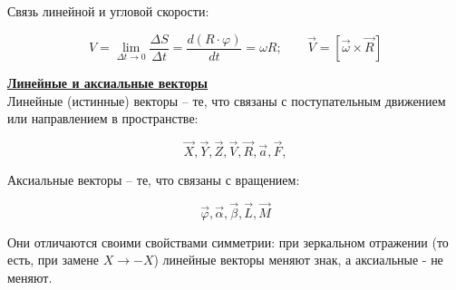 \documentclass[12pt,epsfig,color,russian]{article}
\begin{document}
Связь линейной и угловой скорости:

      \begin{displaymath}
      V=\lim_{\Delta t\rightarrow0}\frac{\Delta S}{\Delta t}=\frac{d(R\cdot\varphi)}{dt}=
      \omega R;\;\;\;\;\;\;\;\vec{V}=\left[\vec{\omega}\times\vec{R}\right]
      \end{displaymath}
\newpage

\underline{\bf Линейные и аксиальные векторы}\\

Линейные (истинные) векторы -- те, что связаны с поступательным движением или направлением в пространстве:

 \begin{displaymath}
 \vec{X}, \vec{Y}, \vec{Z}, \vec{V}, \vec{R}, \vec{a}, \vec{F},
 \end{displaymath}

Аксиальные векторы -- те, что связаны с вращением:

 \begin{displaymath}
 \vec{\varphi}, \vec{\alpha}, \vec{\beta}, \vec{L}, \vec{M}
 \end{displaymath}

Они отличаются своими свойствами симметрии: при зеркальном отра\-жении (то есть, при замене $X \rightarrow -X$) линейные векторы меняют знак, а аксиальные - не меняют.
\end{document}
